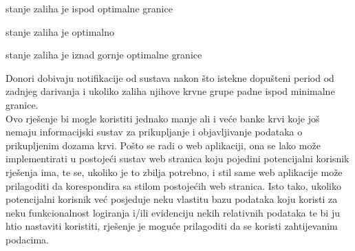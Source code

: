 		\begin{packed_item}
			\item{stanje zaliha je ispod optimalne granice}
			\item{stanje zaliha je optimalno}
			\item{stanje zaliha je iznad gornje optimalne granice}
		\end{packed_item}
		Donori dobivaju notifikacije od sustava nakon što istekne dopušteni period od zadnjeg darivanja i ukoliko zaliha njihove krvne grupe padne ispod minimalne granice.\\
		
		Ovo rješenje bi mogle koristiti jednako manje ali i veće banke krvi koje još nemaju informacijski sustav za prikupljanje i objavljivanje podataka o prikupljenim dozama krvi. Pošto se radi o web aplikaciji, ona se lako može implementirati u postojeći sustav web stranica koju pojedini potencijalni korisnik rješenja ima, te se, ukoliko je to zbilja potrebno, i stil same web aplikacije može prilagoditi da korespondira sa stilom postojećih web stranica. Isto tako, ukoliko potencijalni korisnik već posjeduje neku vlastitu bazu podataka koju koristi za neku funkcionalnost logiranja i/ili evidenciju nekih relativnih podataka te bi ju htio nastaviti koristiti, rješenje je moguće prilagoditi da se koristi zahtijevanim podacima.\\
		
